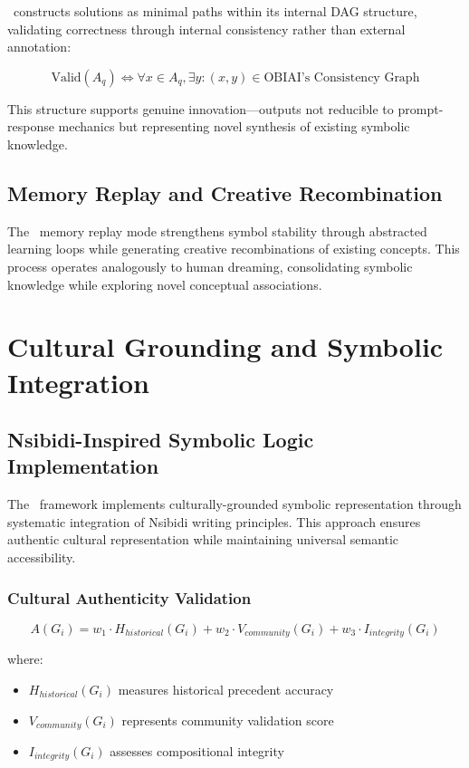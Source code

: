 \documentclass[12pt,twoside,openright]{report}
\begin{document}
\obiai\ constructs solutions as minimal paths within its internal DAG structure, validating correctness through internal consistency rather than external annotation:

\begin{equation}
\text{Valid}(A_q) \iff \forall x \in A_q, \exists y: (x, y) \in \text{OBIAI's Consistency Graph}
\end{equation}

This structure supports genuine innovation—outputs not reducible to prompt-response mechanics but representing novel synthesis of existing symbolic knowledge.

\section{Memory Replay and Creative Recombination}

The \obiai\ memory replay mode strengthens symbol stability through abstracted learning loops while generating creative recombinations of existing concepts. This process operates analogously to human dreaming, consolidating symbolic knowledge while exploring novel conceptual associations.

\chapter{Cultural Grounding and Symbolic Integration}

\section{Nsibidi-Inspired Symbolic Logic Implementation}

The \csl\ framework implements culturally-grounded symbolic representation through systematic integration of Nsibidi writing principles. This approach ensures authentic cultural representation while maintaining universal semantic accessibility.

\subsection{Cultural Authenticity Validation}

\begin{equation}
A(G_i) = w_1 \cdot H_{historical}(G_i) + w_2 \cdot V_{community}(G_i) + w_3 \cdot I_{integrity}(G_i)
\end{equation}

where:
\begin{itemize}
\item $H_{historical}(G_i)$ measures historical precedent accuracy
\item $V_{community}(G_i)$ represents community validation score  
\item $I_{integrity}(G_i)$ assesses compositional integrity
\end{itemize}
\end{document}
